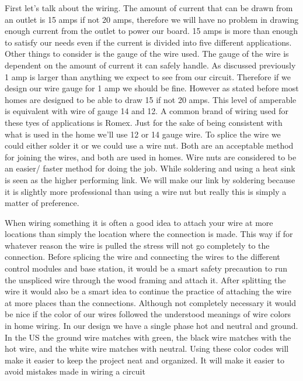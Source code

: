 First let{}'s talk about the wiring. The amount of current that can be drawn
from an outlet is 15 amps if not 20 amps, therefore we will have no problem in
drawing enough current from the outlet to power our board. 15 amps is more than
enough to satisfy our needs even if the current is divided into five different
applications. Other things to consider is the gauge of the wire used. The gauge
of the wire is dependent on the amount of current it can safely handle. As
discussed previously 1 amp is larger than anything we expect to see from our
circuit. Therefore if we design our wire gauge for 1 amp we should be fine.
However as stated before most homes are designed to be able to draw 15 if not
20 amps. This level of amperable is equivalent with wire of gauge 14 and 12. A
common brand of wiring used for these tyes of applications is Romex. Just for
the sake of being consistent with what is used in the home we{}'ll use 12 or 14
gauge wire. To splice the wire we could either solder it or we could use a wire
nut. Both are an acceptable method for joining the wires, and both are used in
homes. Wire nuts are considered to be an easier/ faster method for doing the
job. While soldering and using a heat sink is seen as the higher performing
link. We will make our link by soldering because it is slightly more
professional than using a wire nut but really this is simply a matter of
preference.

When wiring something it is often a good idea to attach your wire at more
locations than simply the location where the connection is made. This way if
for whatever reason the wire is pulled the stress will not go completely to the
connection. Before splicing the wire and connecting the wires to the different
control modules and base station, it would be a smart safety precaution to run
the unspliced wire through the wood framing and attach it. After splitting the
wire it would also be a smart idea to continue the practice of attaching the
wire at more places than the connections. Although not completely necessary it
would be nice if the color of our wires followed the understood meanings of
wire colors in home wiring. In our design we have a single phase hot and
neutral and ground. In the US the ground wire matches with green, the black
wire matches with the hot wire, and the white wire matches with neutral.
\cite{link14}
Using these color codes will make it easier to keep the project neat and
organized. It will make it easier to avoid mistakes made in wiring a circuit

